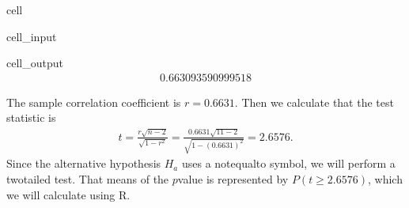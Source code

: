 \documentclass[letterpaper,10pt,english]{jupyterBook}
\begin{document}
\begin{sphinxuseclass}{cell}\begin{sphinxVerbatimInput}

\begin{sphinxuseclass}{cell_input}
\begin{sphinxVerbatim}[commandchars=\\\{\}]

\end{sphinxVerbatim}

\end{sphinxuseclass}\end{sphinxVerbatimInput}
\begin{sphinxVerbatimOutput}

\begin{sphinxuseclass}{cell_output}\begin{equation*}
\begin{split}0.663093590999518\end{split}
\end{equation*}
\end{sphinxuseclass}\end{sphinxVerbatimOutput}

\end{sphinxuseclass}
\sphinxAtStartPar
The sample correlation coefficient is \(r = 0.6631\). Then we calculate that the test statistic is
\begin{equation*}
\begin{split} t = \frac{r\sqrt{n - 2}}{\sqrt{1 - r^2}} = \frac{0.6631\sqrt{11 - 2}}{\sqrt{1 - (0.6631)^2}} = 2.6576. \end{split}
\end{equation*}
\sphinxAtStartPar
Since the alternative hypothesis \(H_a\) uses a not\sphinxhyphen{}equal\sphinxhyphen{}to symbol, we will perform a two\sphinxhyphen{}tailed test. That means  of the \(p\)\sphinxhyphen{}value is represented by \(P(t \geq 2.6576)\), which we will calculate using R.
\end{document}
